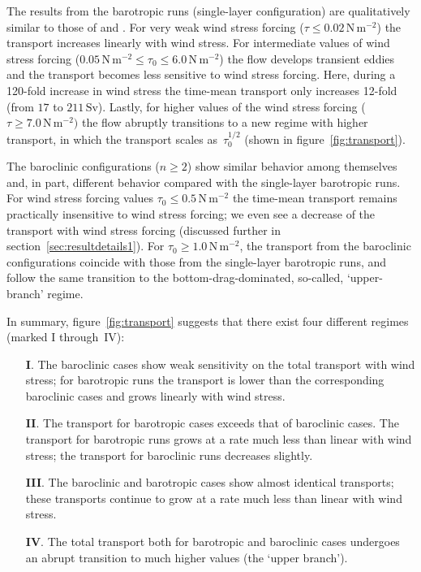 \documentclass{agujournal2019}
\newcommand{\Pa}		{\mathrm{N}\,\mathrm{m}^{-2}}
\begin{document}
The results from the barotropic runs (single-layer configuration) are qualitatively similar to those of  and . For very weak wind stress forcing ($\tau\le0.02\,\Pa$) the transport increases linearly with wind stress. For intermediate values of wind stress forcing ($0.05\,\Pa\le\tau_0\le 6.0\,\Pa$) the flow develops transient eddies and the transport becomes less sensitive to wind stress forcing. Here, during a 120-fold increase in wind stress the time-mean transport only increases 12-fold (from $17$ to $211\,\mathrm{Sv}$). Lastly, for higher values of the wind stress forcing ($\tau\ge 7.0\,\Pa)$ the flow abruptly transitions to a new regime with higher transport, in which the transport scales as~$\tau_0^{1/2}$ (shown in figure~\ref{fig:transport}).




The baroclinic configurations ($n\ge2$) show similar behavior among themselves and, in part, different behavior compared with the single-layer barotropic runs. For wind stress forcing values $\tau_0\le 0.5\,\Pa$ the time-mean transport remains practically insensitive to wind stress forcing; we even see a decrease of the transport with wind stress forcing (discussed further in section~\ref{sec:resultdetails1}). For $\tau_0 \ge 1.0\,\Pa$, the transport from the baroclinic configurations coincide with those from the single-layer barotropic runs, and follow the same transition to the bottom-drag-dominated, so-called, `upper-branch' regime.

In summary, figure~\ref{fig:transport} suggests that there exist four different regimes (marked I through~IV):
\begin{enumerate}
  \item[\textbf{I}.]  The baroclinic cases show {\color{black}weak sensitivity} on the total transport with wind stress; for barotropic runs the transport is lower  than the corresponding baroclinic cases and grows linearly with wind stress.
  \item[\textbf{II}.] The transport for barotropic cases exceeds that of baroclinic cases. The transport for barotropic runs grows at a rate much less than linear with wind stress; the transport for baroclinic runs decreases slightly.
  \item[\textbf{III}.] The baroclinic and barotropic cases show almost identical transports; these transports continue to grow at a rate much less than linear with wind stress.
  \item[\textbf{IV}.] The total transport both for barotropic and baroclinic cases undergoes an abrupt transition to much higher values (the `upper branch').
\end{enumerate}
\end{document}
